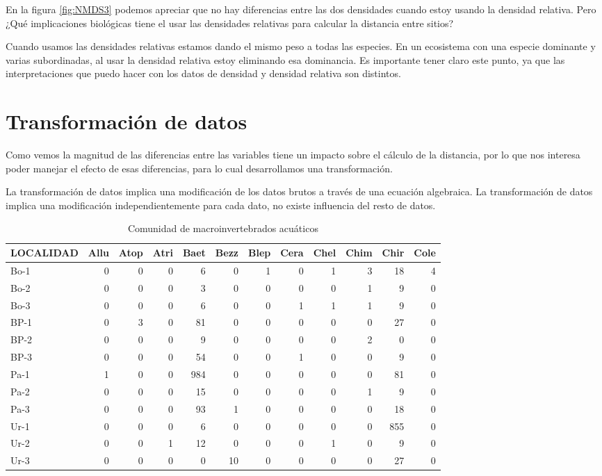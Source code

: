 \documentclass[]{book}
\begin{document}
En la figura \ref{fig:NMDS3} podemos apreciar que no hay diferencias
entre las dos densidades cuando estoy usando la densidad relativa. Pero
¿Qué implicaciones biológicas tiene el usar las densidades relativas
para calcular la distancia entre sitios?

Cuando usamos las densidades relativas estamos dando el mismo peso a
todas las especies. En un ecosistema con una especie dominante y varias
subordinadas, al usar la densidad relativa estoy eliminando esa
dominancia. Es importante tener claro este punto, ya que las
interpretaciones que puedo hacer con los datos de densidad y densidad
relativa son distintos.

\section{Transformación de datos}\label{transformacion-de-datos}

Como vemos la magnitud de las diferencias entre las variables tiene un
impacto sobre el cálculo de la distancia, por lo que nos interesa poder
manejar el efecto de esas diferencias, para lo cual desarrollamos una
transformación.

La transformación de datos implica una modificación de los datos brutos
a través de una ecuación algebraica. La transformación de datos implica
una modificación independientemente para cada dato, no existe influencia
del resto de datos.

\begin{table}

\caption{\label{tab:unnamed-chunk-15}Comunidad de macroinvertebrados acuáticos}
\centering
\begin{tabular}[t]{l|r|r|r|r|r|r|r|r|r|r|r}
\hline
LOCALIDAD & Allu & Atop & Atri & Baet & Bezz & Blep & Cera & Chel & Chim & Chir & Cole\\
\hline
Bo-1 & 0 & 0 & 0 & 6 & 0 & 1 & 0 & 1 & 3 & 18 & 4\\
\hline
Bo-2 & 0 & 0 & 0 & 3 & 0 & 0 & 0 & 0 & 1 & 9 & 0\\
\hline
Bo-3 & 0 & 0 & 0 & 6 & 0 & 0 & 1 & 1 & 1 & 9 & 0\\
\hline
BP-1 & 0 & 3 & 0 & 81 & 0 & 0 & 0 & 0 & 0 & 27 & 0\\
\hline
BP-2 & 0 & 0 & 0 & 9 & 0 & 0 & 0 & 0 & 2 & 0 & 0\\
\hline
BP-3 & 0 & 0 & 0 & 54 & 0 & 0 & 1 & 0 & 0 & 9 & 0\\
\hline
Pa-1 & 1 & 0 & 0 & 984 & 0 & 0 & 0 & 0 & 0 & 81 & 0\\
\hline
Pa-2 & 0 & 0 & 0 & 15 & 0 & 0 & 0 & 0 & 1 & 9 & 0\\
\hline
Pa-3 & 0 & 0 & 0 & 93 & 1 & 0 & 0 & 0 & 0 & 18 & 0\\
\hline
Ur-1 & 0 & 0 & 0 & 6 & 0 & 0 & 0 & 0 & 0 & 855 & 0\\
\hline
Ur-2 & 0 & 0 & 1 & 12 & 0 & 0 & 0 & 1 & 0 & 9 & 0\\
\hline
Ur-3 & 0 & 0 & 0 & 0 & 10 & 0 & 0 & 0 & 0 & 27 & 0\\
\hline
\end{tabular}
\end{table}
\end{document}
